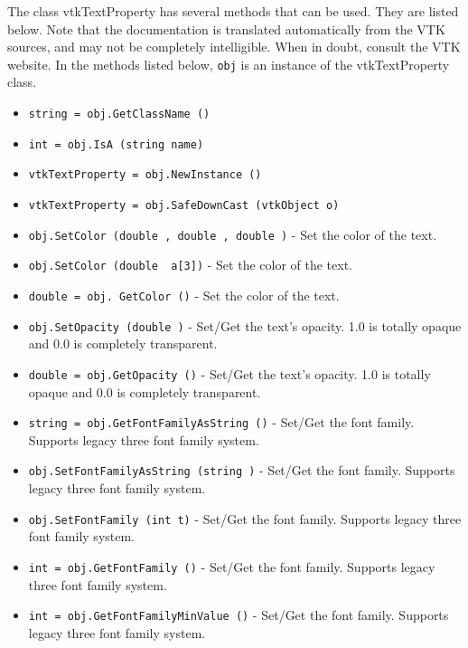The class vtkTextProperty has several methods that can be used.
  They are listed below.
Note that the documentation is translated automatically from the VTK sources,
and may not be completely intelligible.  When in doubt, consult the VTK website.
In the methods listed below, \verb|obj| is an instance of the vtkTextProperty class.
\begin{itemize}
\item  \verb|string = obj.GetClassName ()|

\item  \verb|int = obj.IsA (string name)|

\item  \verb|vtkTextProperty = obj.NewInstance ()|

\item  \verb|vtkTextProperty = obj.SafeDownCast (vtkObject o)|

\item  \verb|obj.SetColor (double , double , double )| -  Set the color of the text.

\item  \verb|obj.SetColor (double  a[3])| -  Set the color of the text.

\item  \verb|double = obj. GetColor ()| -  Set the color of the text.

\item  \verb|obj.SetOpacity (double )| -  Set/Get the text's opacity. 1.0 is totally opaque and 0.0 is completely
 transparent.

\item  \verb|double = obj.GetOpacity ()| -  Set/Get the text's opacity. 1.0 is totally opaque and 0.0 is completely
 transparent.

\item  \verb|string = obj.GetFontFamilyAsString ()| -  Set/Get the font family. Supports legacy three font family system.

\item  \verb|obj.SetFontFamilyAsString (string )| -  Set/Get the font family. Supports legacy three font family system.

\item  \verb|obj.SetFontFamily (int t)| -  Set/Get the font family. Supports legacy three font family system.

\item  \verb|int = obj.GetFontFamily ()| -  Set/Get the font family. Supports legacy three font family system.

\item  \verb|int = obj.GetFontFamilyMinValue ()| -  Set/Get the font family. Supports legacy three font family system.


\end{itemize}
